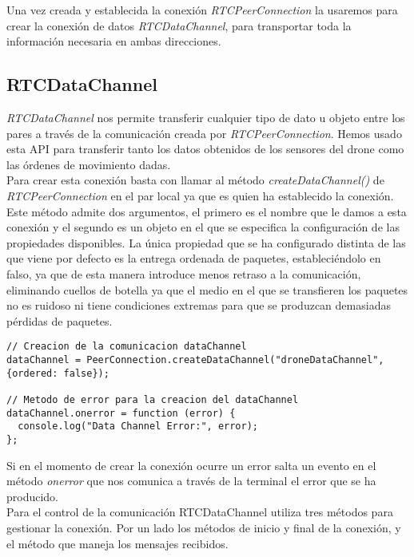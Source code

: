 Una vez creada y establecida la conexión \emph{RTCPeerConnection} la usaremos para crear la conexión de datos \emph{RTCDataChannel}, para transportar toda la información necesaria en ambas direcciones.\\


\subsection{RTCDataChannel}

\emph{RTCDataChannel} nos permite transferir cualquier tipo de dato u objeto entre los pares a través de la comunicación creada por \emph{RTCPeerConnection}. Hemos usado esta API para transferir tanto los datos obtenidos de los sensores del drone como las órdenes de movimiento dadas.\\

Para crear esta conexión basta con llamar al método \emph{createDataChannel()} de \emph{RTCPeerConnection} en el par local ya que es quien ha establecido la conexión. Este método admite dos argumentos, el primero es el nombre que le damos a esta conexión y el segundo es un objeto en el que se especifica la configuración de las propiedades disponibles. La única propiedad que se ha configurado distinta de las que viene por defecto es la entrega ordenada de paquetes, estableciéndolo en falso, ya que de esta manera introduce menos retraso a la comunicación, eliminando cuellos de botella ya que el medio en el que se transfieren los paquetes no es ruidoso ni tiene condiciones extremas para que se produzcan demasiadas pérdidas de paquetes.\\

\begin{lstlisting}[caption=Establecimiento conexión RTCDataChannel en el par local.]
// Creacion de la comunicacion dataChannel
dataChannel = PeerConnection.createDataChannel("droneDataChannel", {ordered: false});

// Metodo de error para la creacion del dataChannel
dataChannel.onerror = function (error) {
  console.log("Data Channel Error:", error);
};\end{lstlisting}

Si en el momento de crear la conexión ocurre un error salta un evento en el método \emph{onerror} que nos comunica a través de la terminal el error que se ha producido.\\

Para el control de la comunicación RTCDataChannel utiliza tres métodos para gestionar la conexión. Por un lado los métodos de inicio y final de la conexión, y el método que maneja los mensajes recibidos.\\

